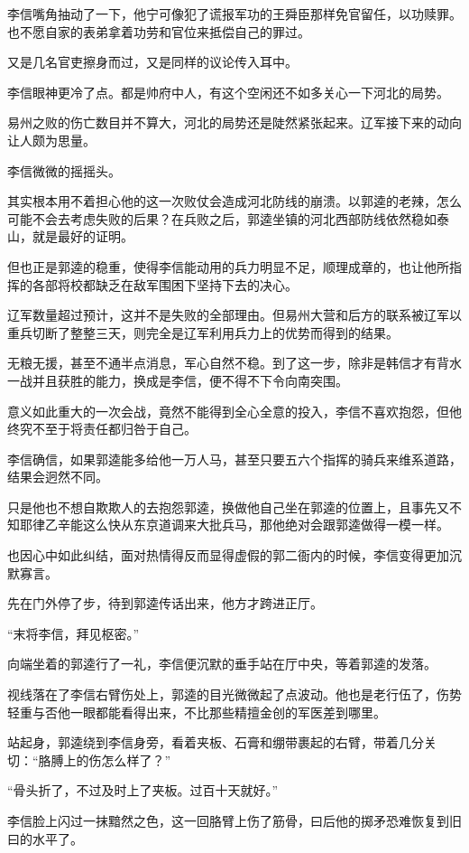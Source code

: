 李信嘴角抽动了一下，他宁可像犯了谎报军功的王舜臣那样免官留任，以功赎罪。也不愿自家的表弟拿着功劳和官位来抵偿自己的罪过。

又是几名官吏擦身而过，又是同样的议论传入耳中。

李信眼神更冷了点。都是帅府中人，有这个空闲还不如多关心一下河北的局势。

易州之败的伤亡数目并不算大，河北的局势还是陡然紧张起来。辽军接下来的动向让人颇为思量。

李信微微的摇摇头。

其实根本用不着担心他的这一次败仗会造成河北防线的崩溃。以郭逵的老辣，怎么可能不会去考虑失败的后果？在兵败之后，郭逵坐镇的河北西部防线依然稳如泰山，就是最好的证明。

但也正是郭逵的稳重，使得李信能动用的兵力明显不足，顺理成章的，也让他所指挥的各部将校都缺乏在敌军围困下坚持下去的决心。

辽军数量超过预计，这并不是失败的全部理由。但易州大营和后方的联系被辽军以重兵切断了整整三天，则完全是辽军利用兵力上的优势而得到的结果。

无粮无援，甚至不通半点消息，军心自然不稳。到了这一步，除非是韩信才有背水一战并且获胜的能力，换成是李信，便不得不下令向南突围。

意义如此重大的一次会战，竟然不能得到全心全意的投入，李信不喜欢抱怨，但他终究不至于将责任都归咎于自己。

李信确信，如果郭逵能多给他一万人马，甚至只要五六个指挥的骑兵来维系道路，结果会迥然不同。

只是他也不想自欺欺人的去抱怨郭逵，换做他自己坐在郭逵的位置上，且事先又不知耶律乙辛能这么快从东京道调来大批兵马，那他绝对会跟郭逵做得一模一样。

也因心中如此纠结，面对热情得反而显得虚假的郭二衙内的时候，李信变得更加沉默寡言。

先在门外停了步，待到郭逵传话出来，他方才跨进正厅。

“末将李信，拜见枢密。”

向端坐着的郭逵行了一礼，李信便沉默的垂手站在厅中央，等着郭逵的发落。

视线落在了李信右臂伤处上，郭逵的目光微微起了点波动。他也是老行伍了，伤势轻重与否他一眼都能看得出来，不比那些精擅金创的军医差到哪里。

站起身，郭逵绕到李信身旁，看着夹板、石膏和绷带裹起的右臂，带着几分关切：“胳膊上的伤怎么样了？”

“骨头折了，不过及时上了夹板。过百十天就好。”

李信脸上闪过一抹黯然之色，这一回胳臂上伤了筋骨，曰后他的掷矛恐难恢复到旧曰的水平了。


